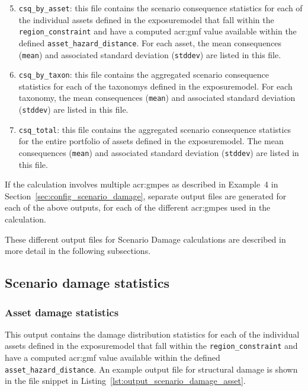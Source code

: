 \begin{enumerate}
\setcounter{enumi}{4}

  \item \Verb+csq_by_asset+: this file contains the scenario consequence
    statistics for each of the individual \glspl{asset} defined in the
    \gls{exposuremodel} that fall within the \Verb+region_constraint+ and have
    a computed \gls{acr:gmf} value available within the defined
    \Verb+asset_hazard_distance+. For each \gls{asset}, the mean consequences
    (\Verb+mean+) and associated standard deviation (\Verb+stddev+) are listed
    in this file.

  \item \Verb+csq_by_taxon+: this file contains the aggregated scenario
    consequence statistics for each of the \glspl{taxonomy} defined in the
    \gls{exposuremodel}. For each \gls{taxonomy}, the mean consequences
    (\Verb+mean+) and associated standard deviation (\Verb+stddev+) are listed
    in this file.

  \item \Verb+csq_total+: this file contains the aggregated scenario
    consequence statistics for the entire portfolio of \glspl{asset} defined
    in the \gls{exposuremodel}. The mean consequences (\Verb+mean+) and 
    associated standard deviation (\Verb+stddev+) are listed in this file.

\end{enumerate}

If the calculation involves multiple \glspl{acr:gmpe} as described in
Example~4 in Section~\ref{sec:config_scenario_damage}, separate output files
are generated for each of the above outputs, for each of the different
\glspl{acr:gmpe} used in the calculation.

These different output files for Scenario Damage calculations are described in
more detail in the following subsections.


\subsection{Scenario damage statistics}
\label{subsec:scenario_damage_statistics}

\subsubsection{Asset damage statistics}
\label{subsubsec:scenario_asset_damage_statistics}

This output contains the damage distribution statistics for each of the
individual \glspl{asset} defined in the \gls{exposuremodel} that fall within
the \Verb+region_constraint+ and have a computed \gls{acr:gmf} value available
within the defined \Verb+asset_hazard_distance+. An example output file for
structural damage is shown in the file snippet in Listing~\ref{lst:output_scenario_damage_asset}.

